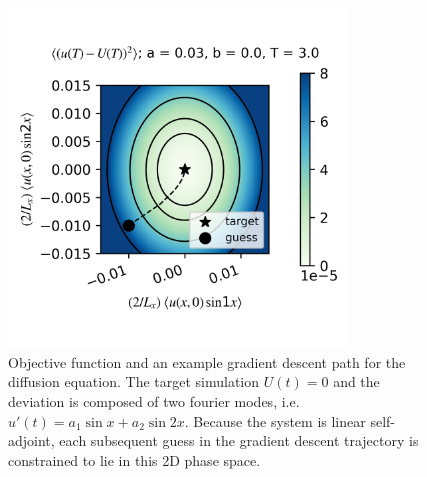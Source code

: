\documentclass[longbibliography,amsmath,amssymb,aps,nofootinbib]{revtex4-2}
\begin{document}
\begin{figure}[h]
  \includegraphics[width=9cm]{objtest_a0p03b0p0c0p0T3p0R0p015kt10p0kt20.png}
  \caption{Objective function and an example gradient descent path for the diffusion equation. The target simulation $U(t) = 0$ and the deviation is composed of two fourier modes, i.e. $u'(t) = a_1\sin x + a_2\sin 2x$. Because the system is linear self-adjoint, each subsequent guess in the gradient descent trajectory is constrained to lie in this 2D phase space.}
  \label{diff_ellipse}
\end{figure}
  
\end{document}
